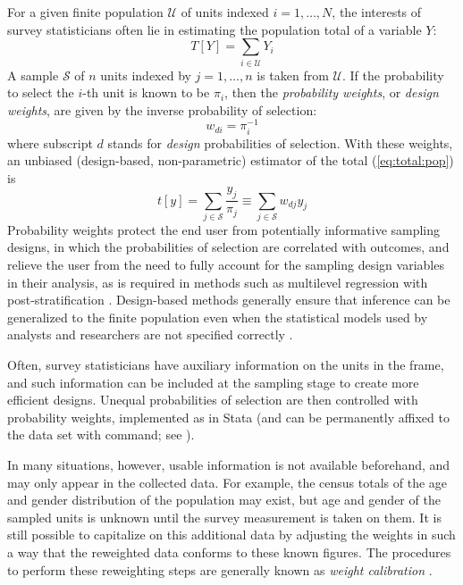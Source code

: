 For a given finite population $\mathcal U$ of units indexed $i=1,\ldots,N$,
the interests of survey statisticians often lie in estimating the
population total of a variable $Y$:
\begin{equation}
   T[Y] = \sum_{i \in \mathcal{U}} Y_i
   \label{eq:total:pop}
\end{equation}
A sample $\mathcal S$ of $n$ units indexed by $j=1,\ldots,n$
is taken from $\mathcal U$. If the probability to select the
$i$-th unit is known to be $\pi_i$, then
the {\it probability weights}, or {\it design weights}, are given by
the inverse probability of selection:
\begin{equation}
   w_{di} = \pi_i^{-1}
   \label{eq:prob:weight}
\end{equation}
where subscript $d$ stands for \textit{design} probabilities of selection.
With these weights, an unbiased
(design-based, non-parametric) estimator
of the total (\ref{eq:total:pop}) is \citep{horvitz:thompson:1952}
\begin{equation}
   t[y] = \sum_{j \in \mathcal{S}} \frac{y_j}{\pi_j}
   \equiv \sum_{j \in \mathcal{S}} w_{dj} y_j
   \label{eq:total:sample}
\end{equation}
Probability weights protect
the end user from potentially informative sampling designs, in which
the probabilities of selection are correlated with outcomes, and
relieve the user from the need to fully account for the sampling design
variables in their analysis, as is required in methods such
as multilevel regression with post-stratification \citep{park:gelman:bafumi:2004}.
Design-based methods generally ensure that inference can be generalized
to the finite population even when the statistical models used
by analysts and researchers are not specified correctly
\citep{pfeff:1993,binder:roberts:2003}.

Often, survey statisticians have auxiliary information on the units
in the frame, and such information can be included at the sampling stage
to create more efficient designs. Unequal probabilities of selection
are then controlled with probability weights, implemented
as \stcmd{[pw=}{\it exp}\stcmd{]} in Stata (and can be permanently
affixed to the data set with  command; see ).

In many situations, however, usable information is not available beforehand,
and may only appear in the collected data. For example, the census totals of the age and gender
distribution of the population may exist, but age and gender of
the sampled units is unknown until the survey measurement is taken on them.
It is still possible to capitalize on this additional data by
adjusting the weights in such a way that the reweighted data
conforms to these known figures. The procedures to perform these
reweighting steps are generally known as {\it weight calibration}
\citep{deville:sarndal:1992,deville:sarndal:sautory:1993,%
kott:2006,kott:2009,sarndal:2007}.

